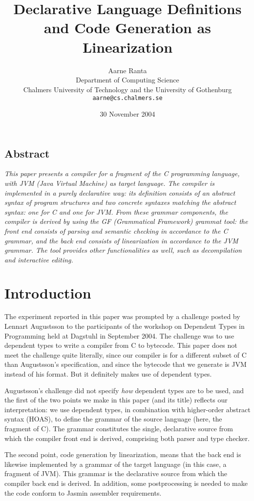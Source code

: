 \documentclass[12pt]{article}
\title{{\bf Declarative Language Definitions and Code Generation as Linearization}}
\author{Aarne Ranta \\
  Department of Computing Science \\
  Chalmers University of Technology and the University of Gothenburg\\
  {\tt aarne@cs.chalmers.se}}
\date{30 November 2004}
\begin{document}
\maketitle


\subsection*{Abstract}

{\em
This paper presents a compiler for a fragment of the C programming
language, with JVM (Java Virtual Machine) as target language.
The compiler is implemented in a purely declarative way:
its definition consists of an abstract syntax of program
structures and two concrete syntaxes matching the abstract
syntax: one for C and one for JVM. From these grammar components,
the compiler is derived by using the GF (Grammatical Framework)
grammat tool: the front end consists of parsing and semantic
checking in accordance to the C grammar, and the back end consists
of linearization in accordance to the JVM grammar. The tool provides
other functionalities as well, such as decompilation and interactive
editing. 
}

\section{Introduction}

The experiment reported in this paper was prompted by a challenge
posted by Lennart Augustsson to the participants of the workshop
on Dependent Types in Programming held at Dagstuhl in September 2004.
The challenge was to use dependent types to write a compiler from
C to bytecode. This paper does not meet the challenge quite literally,
since our compiler is for a different subset of C than Augustsson's
specification, and since the bytecode that we generate is JVM instead
of his format. But it definitely makes use of dependent types.

Augustsson's  challenge did not specify \textit{how} dependent
types are to be used, and the first of the two points we make in this
paper (and its title) reflects our interpretation:
we use dependent types, in combination with higher-order abstract syntax (HOAS),
to define the grammar of the source language (here, the fragment of C).
The grammar constitutes the single, declarative source from which
the compiler front end is derived, comprising both parser and type
checker.

The second point, code generation by linearization, means that the
back end is likewise implemented by a grammar of the target
language (in this case, a fragment of JVM). This grammar is the
declarative source from which the compiler back end is derived.
In addition, some postprocessing is needed to
make the code conform to Jasmin assembler requirements.
\end{document}
